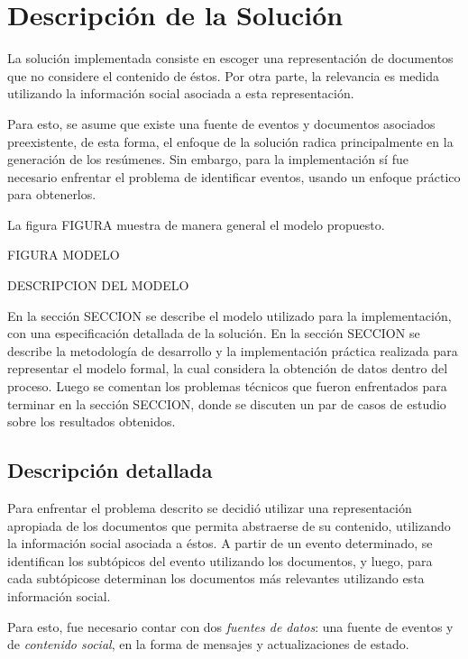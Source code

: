 \chapter{Descripción de la Solución}
\label{sec-1}


  La solución implementada consiste en escoger una
  representación de documentos que no considere el contenido de
  éstos. Por otra parte, la relevancia es medida utilizando la
  información social asociada a esta representación.

  Para esto, se asume que existe una fuente de eventos y documentos
  asociados preexistente, de esta forma, el enfoque de la solución
  radica principalmente en la generación de los resúmenes. Sin
  embargo, para la implementación sí fue necesario enfrentar el
  problema de identificar eventos, usando un enfoque práctico para
  obtenerlos.

  La figura FIGURA muestra de manera general el modelo propuesto.

  FIGURA MODELO

  DESCRIPCION DEL MODELO

  En la sección SECCION se describe el modelo utilizado para la
  implementación, con una especificación detallada de la solución. En la
  sección SECCION se describe la metodología de desarrollo y la
  implementación práctica realizada para representar el modelo
  formal, la cual considera la obtención de datos dentro del
  proceso. Luego se comentan los problemas técnicos que fueron
  enfrentados para terminar en la sección SECCION, donde se discuten
  un par de casos de estudio sobre los resultados obtenidos.

\section{Descripción detallada}
\label{sec-1.1}


   Para enfrentar el problema descrito se decidió utilizar una
   representación apropiada de los documentos que permita abstraerse
   de su contenido, utilizando la información social asociada a
   éstos. A partir de un evento determinado, se identifican los
   subtópicos del evento utilizando los documentos, y luego, para cada
   subtópicose determinan los documentos más relevantes utilizando
   esta información social.

   Para esto, fue necesario contar con dos \emph{fuentes de datos}: una
   fuente de eventos y de \emph{contenido social}, en la forma de mensajes
   y actualizaciones de estado.

